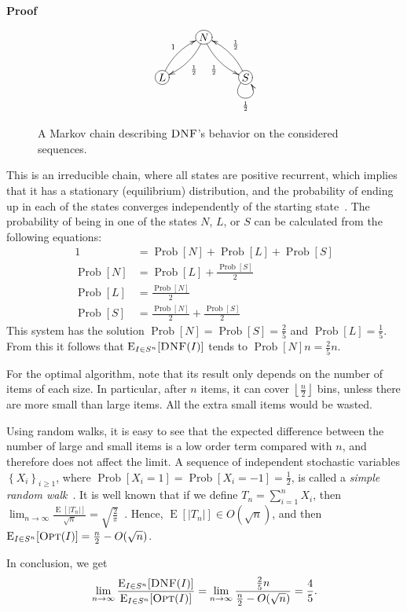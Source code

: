 \documentclass[11pt]{article}
\newenvironment{proof}{\begin{trivlist}\item[]{\bf Proof }}{\hspace*{\fill}\raisebox{-1pt}{\boldmath$\Box$}\end{trivlist}}
\newcommand{\OPT}{\ensuremath{\operatorname{\textsc{Opt}}}\xspace}
\newcommand{\DNF}{\ensuremath{\operatorname{\textsc{DNF}}}\xspace}
\newcommand{\SET}[1]{\left\{#1\right\}}
\newcommand{\PROB}[1]{\ensuremath{\operatorname{Prob}[#1]}}
\newcommand{\EXP}[1]{\ensuremath{\operatorname{E}[#1]}}
\newcommand{\EXPDIST}[2]{\ensuremath{\operatorname{E}_{#1}[#2]}}
\newcommand{\FLOOR}[1]{\left\lfloor#1\right\rfloor}
\begin{document}
\begin{proof}
\begin{figure}[htp]
 \begin{displaymath}
 \xymatrix{ & *+[o][F-]{N} \ar@/^/[dl]^{\frac{1}{2}} \ar@/_/[dr]_{\frac{1}{2}}& \\ *+[o][F-]{L} \ar@/^/[ur]^{1} & & *+[o][F-]{S} \ar@/_/[ul]_{\frac{1}{2}} \ar@(dl,dr)_{\frac{1}{2}}}
\end{displaymath}
\caption{A Markov chain describing \DNF's behavior on the considered sequences.}
\end{figure}

This is an irreducible chain, where all states are positive recurrent,
which implies that 
it has a stationary (equilibrium) distribution, and
the probability of ending up in each of the states converges
independently of the starting state~\cite{D91b}.
The probability of being in one of the states $N$, $L$, or $S$ can be calculated from the following equations:
\begin{align*}
  1 & = \PROB{N} + \PROB{L} + \PROB{S} \\
 \PROB{N} &= \PROB{L} + \frac{\PROB{S}}{2} \\
 \PROB{L} &= \frac{\PROB{N}}{2} \\
 \PROB{S} &= \frac{\PROB{N}}{2} + \frac{\PROB{S}}{2}
\end{align*}
This system has the solution $\PROB{N}=\PROB{S}=\frac{2}{5}$ and
$\PROB{L}=\frac{1}{5}$.
From this it follows that $\EXPDIST{I\in S^n}{\DNF(I)}$ tends to $\PROB{N}n = \frac{2}{5}n$.

For the optimal algorithm, note that its result only depends on the
number of items of each size. In particular, after $n$ items, it can
cover $\FLOOR{\frac{n}{2}}$ bins, unless there
are more small than large items.
All the extra small items would be wasted.

Using random walks, it is easy to see that the expected difference between
the number of large and small items is a low order term compared with $n$,
and therefore does not affect the limit.
A sequence of independent stochastic variables $\SET{X_i}_{i\geq1}$,
where $\PROB{X_i=1}=\PROB{X_i=-1}=\frac{1}{2}$,
is called a {\em simple random walk}~\cite{D91b}.
It is well known that if we define $T_n=\sum_{i=1}^n X_i$,
then $\lim_{n\rightarrow\infty}\frac{\EXP{|T_n|}}{\sqrt{n}}=\sqrt{\frac{2}{\pi}}$~\cite{H94b}.
Hence, $\EXP{|T_n|}\in O(\sqrt{n})$,
and then
$\EXPDIST{I\in S^n}{\OPT(I)} = \frac{n}{2} - O(\sqrt{n})$.

In conclusion, we get
\[
 \lim\limits_{n \rightarrow \infty}
    \frac{\EXPDIST{I\in S^n}{\DNF(I)}}{\EXPDIST{I\in S^n}{\OPT(I)}}
  = \lim\limits_{n \rightarrow \infty}\frac{\frac{2}{5}n}{\frac{n}{2}-O(\sqrt{n})}
  = \frac{4}{5}.
\]
\end{proof}
\end{document}
